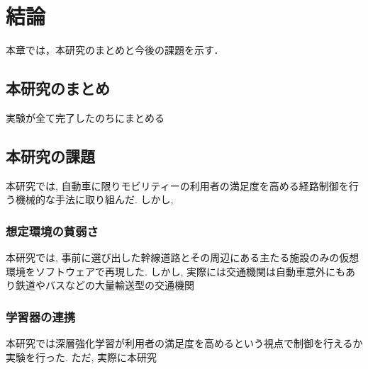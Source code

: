\chapter{結論}
\label{conclusion}

本章では，本研究のまとめと今後の課題を示す．

\section{本研究のまとめ}

実験が全て完了したのちにまとめる

\section{本研究の課題}

本研究では, 自動車に限りモビリティーの利用者の満足度を高める経路制御を行う機械的な手法に取り組んだ.
しかし,

\subsection{想定環境の貧弱さ}

本研究では, 事前に選び出した幹線道路とその周辺にある主たる施設のみの仮想環境をソフトウェアで再現した. 
しかし, 実際には交通機関は自動車意外にもあり鉄道やバスなどの大量輸送型の交通機関

\subsection{学習器の連携}

本研究では深層強化学習が利用者の満足度を高めるという視点で制御を行えるか実験を行った. ただ, 実際に本研究

